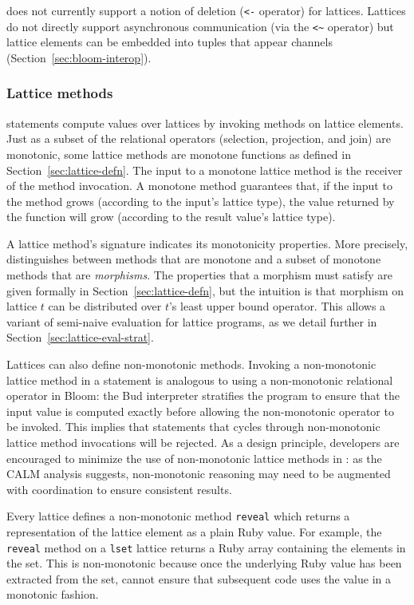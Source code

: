 \lang does not currently support a notion of deletion (\verb|<-| operator) for
lattices. Lattices do not directly support asynchronous communication (via the
\verb|<~| operator) but lattice elements can be embedded into tuples that appear
channels (Section~\ref{sec:bloom-interop}).

\subsubsection{Lattice methods}
\lang statements compute values over lattices by invoking methods on lattice
elements. Just as a subset of the relational operators (selection, projection,
and join) are monotonic, some lattice methods are monotone functions as defined
in Section~\ref{sec:lattice-defn}. The input to a monotone lattice method is the
receiver of the method invocation. A monotone method guarantees that, if the
input to the method grows (according to the input's lattice type), the value
returned by the function will grow (according to the result value's lattice
type).

A lattice method's signature indicates its monotonicity properties. More
precisely, \lang distinguishes between methods that are monotone and a subset of
monotone methods that are \emph{morphisms}. The properties that a morphism must
satisfy are given formally in Section~\ref{sec:lattice-defn}, but the intuition
is that morphism on lattice $t$ can be distributed over $t$'s least upper bound
operator. This allows a variant of semi-naive evaluation for lattice programs,
as we detail further in Section~\ref{sec:lattice-eval-strat}.

Lattices can also define non-monotonic methods. Invoking a non-monotonic lattice
method in a statement is analogous to using a non-monotonic relational operator
in Bloom: the Bud interpreter stratifies the program to ensure that the input
value is computed exactly before allowing the non-monotonic operator to be
invoked. This implies that statements that cycles through non-monotonic lattice
method invocations will be rejected. As a design principle, developers are
encouraged to minimize the use of non-monotonic lattice methods in \lang: as the
CALM analysis suggests, non-monotonic reasoning may need to be augmented with
coordination to ensure consistent results.

Every lattice defines a non-monotonic method \texttt{reveal} which returns a
representation of the lattice element as a plain Ruby value. For example, the
\texttt{reveal} method on a \texttt{lset} lattice returns a Ruby array
containing the elements in the set. This is non-monotonic because once the
underlying Ruby value has been extracted from the set, \lang cannot ensure that
subsequent code uses the value in a monotonic fashion.

